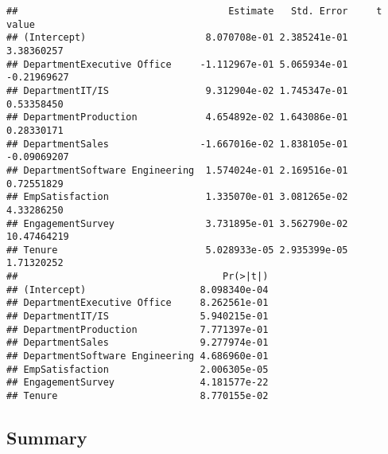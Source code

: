 \documentclass[
]{article}
\newenvironment{Shaded}{\begin{snugshade}}{\end{snugshade}}
\newcommand{\CommentTok}[1]{\textcolor[rgb]{0.56,0.35,0.01}{\textit{#1}}}
\newcommand{\DecValTok}[1]{\textcolor[rgb]{0.00,0.00,0.81}{#1}}
\newcommand{\DocumentationTok}[1]{\textcolor[rgb]{0.56,0.35,0.01}{\textbf{\textit{#1}}}}
\newcommand{\NormalTok}[1]{#1}
\newcommand{\OtherTok}[1]{\textcolor[rgb]{0.56,0.35,0.01}{#1}}
\newcommand{\SpecialCharTok}[1]{\textcolor[rgb]{0.81,0.36,0.00}{\textbf{#1}}}
\begin{document}
\begin{verbatim}
##                                     Estimate   Std. Error     t value
## (Intercept)                     8.070708e-01 2.385241e-01  3.38360257
## DepartmentExecutive Office     -1.112967e-01 5.065934e-01 -0.21969627
## DepartmentIT/IS                 9.312904e-02 1.745347e-01  0.53358450
## DepartmentProduction            4.654892e-02 1.643086e-01  0.28330171
## DepartmentSales                -1.667016e-02 1.838105e-01 -0.09069207
## DepartmentSoftware Engineering  1.574024e-01 2.169516e-01  0.72551829
## EmpSatisfaction                 1.335070e-01 3.081265e-02  4.33286250
## EngagementSurvey                3.731895e-01 3.562790e-02 10.47464219
## Tenure                          5.028933e-05 2.935399e-05  1.71320252
##                                    Pr(>|t|)
## (Intercept)                    8.098340e-04
## DepartmentExecutive Office     8.262561e-01
## DepartmentIT/IS                5.940215e-01
## DepartmentProduction           7.771397e-01
## DepartmentSales                9.277974e-01
## DepartmentSoftware Engineering 4.686960e-01
## EmpSatisfaction                2.006305e-05
## EngagementSurvey               4.181577e-22
## Tenure                         8.770155e-02
\end{verbatim}

\begin{Shaded}
\end{Shaded}

\subsection{Summary}\label{summary-1}
\end{document}
